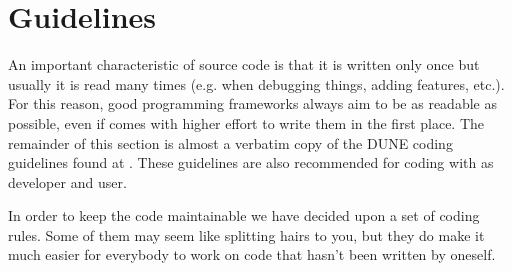 \section{Guidelines} 
\label{guidelines}

An important characteristic of source code is that it is written only
once but usually it is read many times (e.g. when debugging things,
adding features, etc.). For this reason, good programming frameworks
always aim to be as readable as possible, even if comes with higher
effort to write them in the first place. The remainder of this section
is almost a verbatim copy of the DUNE coding guidelines found at
\cite{DUNE-HP}. These guidelines are also recommended for coding with
\Dumux as developer and user.

In order to keep the code maintainable we have decided upon a set of
coding rules.  Some of them may seem like splitting hairs to you, but
they do make it much easier for everybody to work on code that hasn't
been written by oneself.


